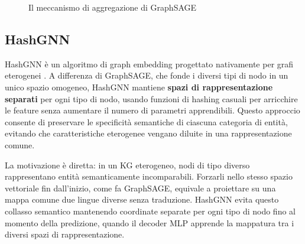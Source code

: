 \begin{figure}[ht!] \centering {} \caption{Il meccanismo di aggregazione di GraphSAGE} \label{fig:graphsage_aggregation} \end{figure}


\subsection{HashGNN}
HashGNN è un algoritmo di graph embedding progettato nativamente per grafi eterogenei \cite{neo4j_hashgnn}. A differenza di GraphSAGE, che fonde i diversi tipi di nodo in un unico spazio omogeneo, HashGNN mantiene \textbf{spazi di rappresentazione separati} per ogni tipo di nodo, usando funzioni di hashing casuali per arricchire le feature senza aumentare il numero di parametri apprendibili. Questo approccio consente di preservare le specificità semantiche di ciascuna categoria di entità, evitando che caratteristiche eterogenee vengano diluite in una rappresentazione comune.

La motivazione è diretta: in un KG eterogeneo, nodi di tipo diverso rappresentano entità semanticamente incomparabili. Forzarli nello stesso spazio vettoriale fin dall'inizio, come fa GraphSAGE, equivale a proiettare su una mappa comune due lingue diverse senza traduzione. HashGNN evita questo collasso semantico mantenendo coordinate separate per ogni tipo di nodo fino al momento della predizione, quando il decoder MLP apprende la mappatura tra i diversi spazi di rappresentazione.

